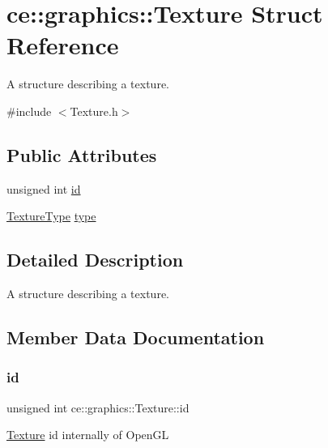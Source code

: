 \hypertarget{structce_1_1graphics_1_1_texture}{}\section{ce\+:\+:graphics\+:\+:Texture Struct Reference}
\label{structce_1_1graphics_1_1_texture}


A structure describing a texture.  




{\ttfamily \#include $<$Texture.\+h$>$}

\subsection*{Public Attributes}
\begin{DoxyCompactItemize}
\item 
unsigned int \hyperlink{structce_1_1graphics_1_1_texture_af9e415b9175764428d5d6dddd1778e93}{id}
\item 
\hyperlink{_texture_8h_aefaa1df613346ad1fea779bc9a04fdd7}{Texture\+Type} \hyperlink{structce_1_1graphics_1_1_texture_a0c6ddb1eacae739d37e336ea03fa01ec}{type}
\end{DoxyCompactItemize}


\subsection{Detailed Description}
A structure describing a texture. 

\subsection{Member Data Documentation}
\mbox{\label{structce_1_1graphics_1_1_texture_af9e415b9175764428d5d6dddd1778e93}} 
\subsubsection{\texorpdfstring{id}{id}}
{\footnotesize\ttfamily unsigned int ce\+::graphics\+::\+Texture\+::id}

\hyperlink{structce_1_1graphics_1_1_texture}{Texture} id internally of Open\+GL \mbox{\label{structce_1_1graphics_1_1_texture_a0c6ddb1eacae739d37e336ea03fa01ec}} 
